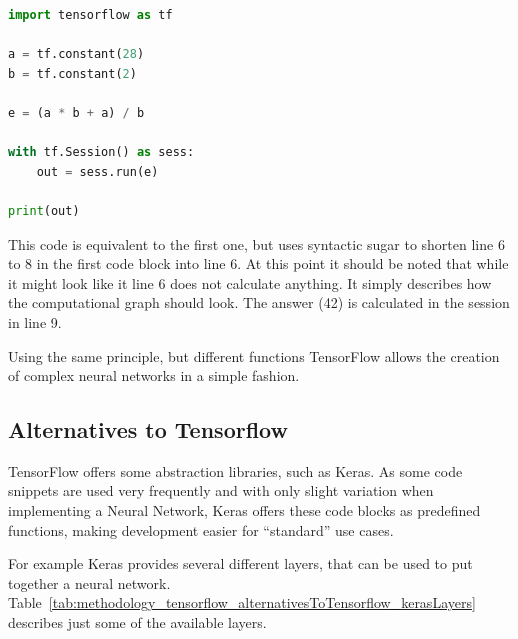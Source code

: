 \begin{lstlisting}[language=python]
import tensorflow as tf

a = tf.constant(28)
b = tf.constant(2)

e = (a * b + a) / b

with tf.Session() as sess:
    out = sess.run(e)

print(out)
\end{lstlisting}

This code is equivalent to the first one, but uses syntactic sugar to shorten line 6 to 8 in the first code block into line 6. At this point it should be noted that while it might look like it line 6 does not calculate anything. It simply describes how the computational graph should look. The answer (42) is calculated in the session in line 9.

Using the same principle, but different functions TensorFlow allows the creation of complex neural networks in a simple fashion.

\subsection{Alternatives to Tensorflow}
TensorFlow offers some abstraction libraries, such as Keras. As some code snippets are used very frequently and with only slight variation when implementing a Neural Network, Keras offers these code blocks as predefined functions, making development easier for ``standard'' use cases.

For example Keras provides several different layers, that can be used to put together a neural network. Table~\ref{tab:methodology_tensorflow_alternativesToTensorflow_kerasLayers} describes just some of the available layers.

